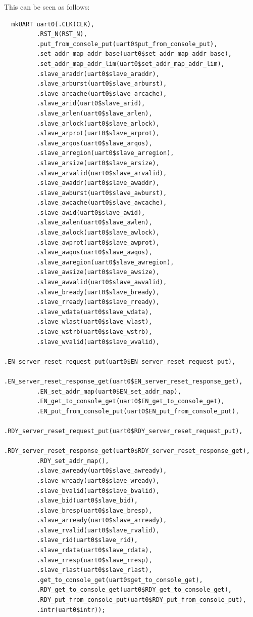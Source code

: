 \documentclass[a4paper,8pt]{report}
\begin{document}
This can be seen as follows:
\tiny
\begin{verbatim}
  mkUART uart0(.CLK(CLK),
         .RST_N(RST_N),
         .put_from_console_put(uart0$put_from_console_put),
         .set_addr_map_addr_base(uart0$set_addr_map_addr_base),
         .set_addr_map_addr_lim(uart0$set_addr_map_addr_lim),
         .slave_araddr(uart0$slave_araddr),
         .slave_arburst(uart0$slave_arburst),
         .slave_arcache(uart0$slave_arcache),
         .slave_arid(uart0$slave_arid),
         .slave_arlen(uart0$slave_arlen),
         .slave_arlock(uart0$slave_arlock),
         .slave_arprot(uart0$slave_arprot),
         .slave_arqos(uart0$slave_arqos),
         .slave_arregion(uart0$slave_arregion),
         .slave_arsize(uart0$slave_arsize),
         .slave_arvalid(uart0$slave_arvalid),
         .slave_awaddr(uart0$slave_awaddr),
         .slave_awburst(uart0$slave_awburst),
         .slave_awcache(uart0$slave_awcache),
         .slave_awid(uart0$slave_awid),
         .slave_awlen(uart0$slave_awlen),
         .slave_awlock(uart0$slave_awlock),
         .slave_awprot(uart0$slave_awprot),
         .slave_awqos(uart0$slave_awqos),
         .slave_awregion(uart0$slave_awregion),
         .slave_awsize(uart0$slave_awsize),
         .slave_awvalid(uart0$slave_awvalid),
         .slave_bready(uart0$slave_bready),
         .slave_rready(uart0$slave_rready),
         .slave_wdata(uart0$slave_wdata),
         .slave_wlast(uart0$slave_wlast),
         .slave_wstrb(uart0$slave_wstrb),
         .slave_wvalid(uart0$slave_wvalid),
         .EN_server_reset_request_put(uart0$EN_server_reset_request_put),
         .EN_server_reset_response_get(uart0$EN_server_reset_response_get),
         .EN_set_addr_map(uart0$EN_set_addr_map),
         .EN_get_to_console_get(uart0$EN_get_to_console_get),
         .EN_put_from_console_put(uart0$EN_put_from_console_put),
         .RDY_server_reset_request_put(uart0$RDY_server_reset_request_put),
         .RDY_server_reset_response_get(uart0$RDY_server_reset_response_get),
         .RDY_set_addr_map(),
         .slave_awready(uart0$slave_awready),
         .slave_wready(uart0$slave_wready),
         .slave_bvalid(uart0$slave_bvalid),
         .slave_bid(uart0$slave_bid),
         .slave_bresp(uart0$slave_bresp),
         .slave_arready(uart0$slave_arready),
         .slave_rvalid(uart0$slave_rvalid),
         .slave_rid(uart0$slave_rid),
         .slave_rdata(uart0$slave_rdata),
         .slave_rresp(uart0$slave_rresp),
         .slave_rlast(uart0$slave_rlast),
         .get_to_console_get(uart0$get_to_console_get),
         .RDY_get_to_console_get(uart0$RDY_get_to_console_get),
         .RDY_put_from_console_put(uart0$RDY_put_from_console_put),
         .intr(uart0$intr));
\end{verbatim}
\normalsize
\end{document}
